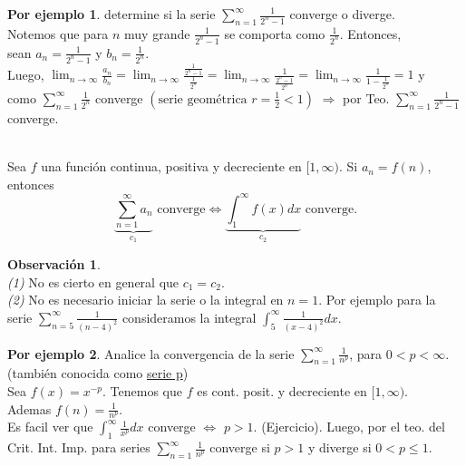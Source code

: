 \documentclass{article}
\theoremstyle{definition}
\newtheorem*{obs}{Observación}
\newtheorem*{ej}{Por ejemplo}
\theoremstyle{remark}
\begin{document}
\begin{ej}
  determine si la serie $\sum_{n=1}^{\infty}{\frac{1}{2^n-1}}$ converge o diverge. \\
  Notemos que para $n$ muy grande $\frac{1}{2^n-1}$ se comporta como $\frac{1}{2^n}$. Entonces, \\
  sean $a_n=\frac{1}{2^n-1}$ y $b_n=\frac{1}{2^n}$. \\
Luego, $\lim_{n\to\infty}{\frac{a_n}{b_n}}=\lim_{n\to\infty}{\frac{\frac{1}{2^n-1}}{\frac{1}{2^n}}}=\lim_{n\to\infty} {\frac{1}{\frac{2^n-1}{2^n}}}=\lim_{n\to\infty}{\frac{1}{1-\frac{1}{2^n}}}=1$ y \\
como $\sum_{n=1}^{\infty}{\frac{1}{2^n}}$ converge $\left(\text{serie geométrica } r=\frac{1}{2}<1\right)$ $\Rightarrow$ por Teo. $\sum_{n=1}^{\infty}{\frac{1}{2^n-1}}$ converge. 

\end{ej}

\pagebreak

\begin{teo} \; \\
  Sea $f$ una función continua, positiva y decreciente en $[1,\infty)$. Si $a_n=f(n)$, entonces 
  \[
    \underbrace{\sum_{n=1}^{\infty}{a_n}}_{c_1} \text{ converge} \Leftrightarrow \underbrace{\int_{1}^{\infty}{f(x)dx}}_{c_2} \text{ converge.}
  \]
\end{teo}

\begin{obs} \; \\
  \emph{(1)} No es cierto en general que $c_1=c_2$. \\
  \emph{(2)} No es necesario iniciar la serie o la integral en $n=1$. Por ejemplo para la serie $\sum_{n=5}^{\infty}{\frac{1}{(n-4)^2}}$ consideramos la integral $\int_{5}^{\infty}{\frac{1}{(x-4)^2}dx.}$
\end{obs}


\begin{ej}
Analice la convergencia de la serie $\sum_{n=1}^{\infty}{\frac{1}{n^p}}$, para $0<p<\infty$. (también conocida como \underline{serie p}) \\ 
Sea $f(x)=x^{-p}$. Tenemos que $f$ es cont. posit. y decreciente en $[1,\infty)$.\\
Ademas $f(n)=\frac{1}{n^p}$. \\
Es facil ver que $\int_{1}^\infty{\frac{1}{x^p}dx}$ converge $\Leftrightarrow$ $p>1$. (Ejercicio). Luego, por el teo. del Crit. Int. Imp. para series $\sum_{n=1}^{\infty}{\frac{1}{n^p}}$ converge si $p>1$ y diverge si $0<p\leq 1$.
\end{ej}
\end{document}

